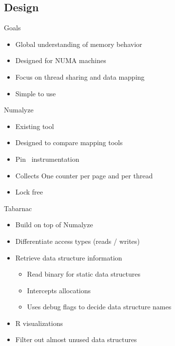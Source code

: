 \documentclass[xcolor={usenames,dvipsnames},hyperref={pdfusetitle}]{beamer}
\begin{document}
\subsection{Design}

\begin{frame}{Goals}
    \begin{block}{}
        \begin{itemize}
            \item Global understanding of memory behavior
            \item Designed for NUMA machines
            \item Focus on thread sharing and data mapping
            \item Simple to use
        \end{itemize}
    \end{block}
\end{frame}

\begin{frame}{Numalyze~\cite{Diener15Characterizing}}
    \begin{block}{}
        \begin{itemize}
            \item Existing tool
            \item Designed to compare mapping tools
            \item Pin~\cite{Luk05Pin} instrumentation
            \item Collects One counter per page and per thread
            \item Lock free
        \end{itemize}
    \end{block}
\end{frame}

\begin{frame}{Tabarnac}
    \begin{alertblock}{}
        \begin{itemize}
            \item Build on top of Numalyze
            \item Differentiate access types (reads / writes)
            \item Retrieve data structure information
                \begin{itemize}
                    \item Read binary for static data structures
                    \item Intercepts allocations
                    \item Uses debug flags to decide data structure names
                \end{itemize}
            \item R visualizations
            \item Filter out almost unused data structures
        \end{itemize}
    \end{alertblock}
\end{frame}
\end{document}
